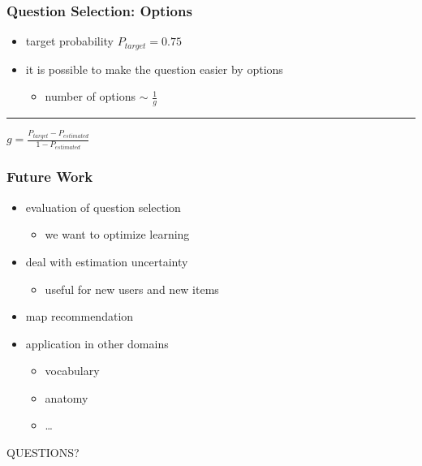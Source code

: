 \documentclass[xcolor=svgnames]{beamer}
\begin{document}
\begin{frame}
	\frametitle{Question Selection: Options}
	\begin{itemize}
		\item target probability $P_{target} = 0.75$
		\item it is possible to make the question easier by options
			\begin{itemize}
				\item number of options $\sim$ $\frac{1}{g}$
			\end{itemize}
	\end{itemize}

	\bigskip

	\hrule

	\begin{center}
		\Large
		$g = \frac{P_{target} - P_{estimated}}{1 - P_{estimated}}$
	\end{center}

\end{frame}
\begin{frame}
	\frametitle{Future Work}

	\begin{itemize}
		\item evaluation of question selection
			\begin{itemize}
				\item we want to optimize learning
			\end{itemize}
		\item deal with estimation uncertainty
			\begin{itemize}
				\item useful for new users and new items
			\end{itemize}
		\item map recommendation
		\item application in other domains
			\begin{itemize}
				\item vocabulary
				\item anatomy
				\item \ldots
			\end{itemize}
	\end{itemize}
\end{frame}
\begin{frame}
	\begin{center}
		\Huge QUESTIONS?
	\end{center}
\end{frame}
\end{document}
